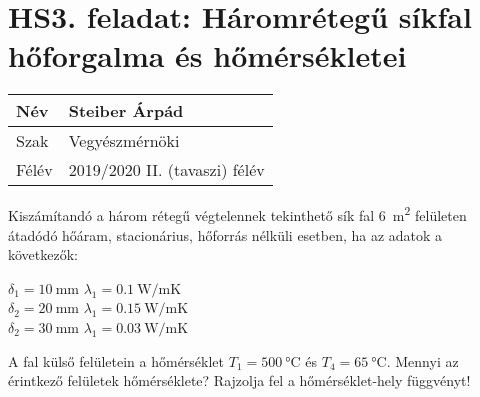 
\section*{HS3. feladat: Háromrétegű síkfal hőforgalma és hőmérsékletei}


\begin{tabular}{ | p{2cm} | p{14cm} | } 
	\hline
	Név & Steiber Árpád \\ 
	\hline
	Szak & Vegyészmérnöki \\ 
	\hline
	Félév & 2019/2020 II. (tavaszi) félév \\ 
	\hline
\end{tabular}
\vspace{0.5cm}

\noindent Kiszámítandó a három rétegű végtelennek tekinthető sík fal \SI{6}{\meter\squared} felületen átadódó hőáram, stacionárius, hőforrás nélküli esetben, ha az adatok a következők:
\begin{center}
	$\delta_1 = \SI{10}{\milli\meter}$ $\lambda_1 = \SI{0.1}{\watt\per\meter\kelvin}$ \\
	\vspace{2mm}
	$\delta_2 = \SI{20}{\milli\meter}$ $\lambda_1 = \SI{0.15}{\watt\per\meter\kelvin}$ \\
	\vspace{2mm}
	$\delta_2 = \SI{30}{\milli\meter}$ $\lambda_1 = \SI{0.03}{\watt\per\meter\kelvin}$ \\
\end{center}

\vspace{2mm}

 A fal külső felületein a hőmérséklet $T_1 = \SI{500}{\celsius}$ és $T_4 = \SI{65}{\celsius}$. Mennyi az érintkező felületek hőmérséklete? Rajzolja fel a hőmérséklet-hely függvényt!
 
\vspace{2mm}

